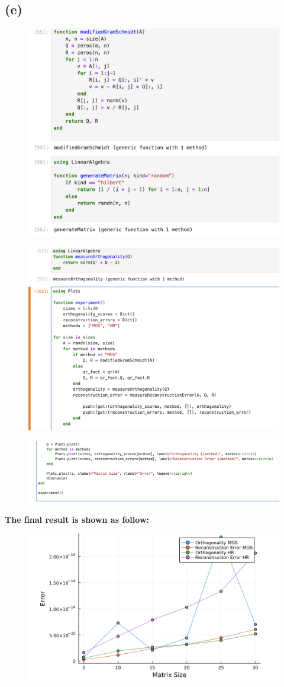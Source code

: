 \documentclass{article}
\begin{document}
\subsection{(e)}
\begin{figure}[H]
    \centering
    \includegraphics[width=0.75\linewidth]{Screenshot 2024-03-05 at 01.37.13.png}
    
    
\end{figure}
\begin{figure}[H]
    \centering
    \includegraphics[width=0.75\linewidth]{Screenshot 2024-03-05 at 01.37.39.png}
    
    
\end{figure}
\begin{figure}[H]
    \centering
    \includegraphics[width=0.75\linewidth]{Screenshot 2024-03-05 at 01.37.59.png}
    
    
\end{figure}
\textbf{The final result is shown as follow:}
\begin{figure}[H]
\centering
    \includegraphics[width=0.75\linewidth]{Screenshot 2024-03-05 at 01.36.41.png}  
\end{figure}
\end{document}
